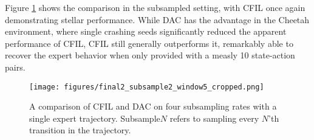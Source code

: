 Figure \ref{fig:subsample} shows the comparison in the subsampled setting, with CFIL once again demonstrating stellar performance. While DAC has the advantage in the Cheetah environment, where single crashing seeds significantly reduced the apparent performance of CFIL, CFIL still generally outperforms it, remarkably able to recover the expert behavior when only provided with a measly 10 state-action pairs.


\begin{figure}[t]
\vskip 0.1in
\centering
\texttt{[image: figures/final2\_subsample2\_window5\_cropped.png]} %
\caption{A comparison of CFIL and DAC on four subsampling rates with a single expert trajectory. Subsample$N$ refers to sampling every $N$'th transition in the trajectory.}
\label{fig:subsample}
\vskip -0.1in
\end{figure} 

